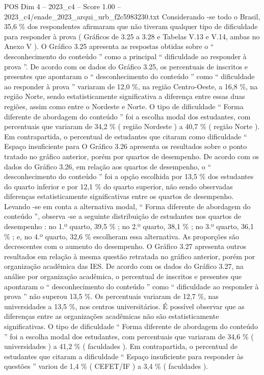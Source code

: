 \begin{textsample}{POS Dim 4 – 2023\_c4 – Score 1.00 – 2023\_c4/enade\_2023\_arqui\_urb\_f2c5983230.txt}
Considerando -se todo o Brasil, 35,6 \% dos respondentes afirmaram que não tiveram qualquer tipo de dificuldade para responder à prova ( Gráficos de 3.25 a 3.28 e Tabelas V.13 e V.14, ambas no Anexo V ).
O Gráfico 3.25 apresenta as respostas obtidas sobre o “ desconhecimento do conteúdo ” como a principal “ dificuldade ao responder à prova ”.
De acordo com os dados do Gráfico 3.25, os percentuais de inscritos e presentes que apontaram o “ desconhecimento do conteúdo ” como “ dificuldade ao responder à prova ” variaram de 12,0 \%, na região Centro-Oeste, a 16,8 \%, na região Norte, sendo estatisticamente significativa a diferença entre essas duas regiões, assim como entre o Nordeste e Norte.
O tipo de dificuldade “ Forma diferente de abordagem do conteúdo ” foi a escolha modal dos estudantes, com percentuais que variaram de 34,2 \% ( região Nordeste ) a 40,7 \% ( região Norte ).
Em contrapartida, o percentual de estudantes que citaram como dificuldade “ Espaço insuficiente para O Gráfico 3.26 apresenta os resultados sobre o ponto tratado no gráfico anterior, porém por quartos de desempenho.
De acordo com os dados do Gráfico 3.26, em relação aos quartos de desempenho, o “ desconhecimento do conteúdo ” foi a opção escolhida por 13,5 \% dos estudantes do quarto inferior e por 12,1 \% do quarto superior, não sendo observadas diferenças estatisticamente significativas entre os quartos de desempenho.
Levando -se em conta a alternativa modal, “ Forma diferente de abordagem do conteúdo ”, observa -se a seguinte distribuição de estudantes nos quartos de desempenho : no 1.º quarto, 39,5 \% ; no 2.º quarto, 38,1 \% ; no 3.º quarto, 36,1 \% ; e, no 4.º quarto, 32,6 \% escolheram essa alternativa.
As proporções são decrescentes com o aumento do desempenho.
O Gráfico 3.27 apresenta outros resultados em relação à mesma questão retratada no gráfico anterior, porém por organização acadêmica das IES.
De acordo com os dados do Gráfico 3.27, na análise por organização acadêmica, o percentual de inscritos e presentes que apontaram o “ desconhecimento do conteúdo ” como “ dificuldade ao responder à prova ” não superou 13,5 \%.
Os percentuais variaram de 12,7 \%, nas universidades a 13,5 \%, nos centros universitários.
É possível observar que as diferenças entre as organizações acadêmicas não são estatisticamente significativas.
O tipo de dificuldade “ Forma diferente de abordagem do conteúdo ” foi a escolha modal dos estudantes, com percentuais que variaram de 34,6 \% ( universidades ) a 41,2 \% ( faculdades ).
Em contrapartida, o percentual de estudantes que citaram a dificuldade “ Espaço insuficiente para responder às questões ” variou de 1,4 \% ( CEFET/IF ) a 3,4 \% ( faculdades ).

\end{textsample}
